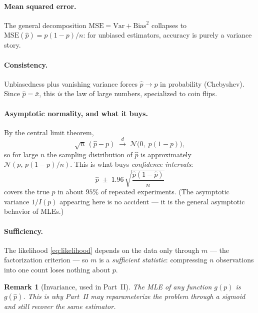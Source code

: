 \documentclass[11pt]{article}
\newtheorem{remark}{Remark}
\newcommand{\xbar}{\bar{x}}
\newcommand{\phat}{\hat{p}}
\begin{document}
\paragraph{Mean squared error.} The general decomposition
$\mathrm{MSE} = \mathrm{Var} + \mathrm{Bias}^{2}$ collapses to
$\mathrm{MSE}(\phat) = p(1-p)/n$: for unbiased estimators, accuracy is
purely a variance story.

\paragraph{Consistency.} Unbiasedness plus vanishing variance forces
$\phat \to p$ in probability (Chebyshev). Since $\phat = \xbar$, this
\emph{is} the law of large numbers, specialized to coin flips.

\paragraph{Asymptotic normality, and what it buys.}
By the central limit theorem,
\begin{equation}
  \sqrt{n}\,(\phat - p) \;\xrightarrow{\;d\;}\;
  \mathcal{N}\bigl(0,\; p(1-p)\bigr),
  \label{eq:clt}
\end{equation}
so for large $n$ the sampling distribution of $\phat$ is approximately
$\mathcal{N}(p,\, p(1-p)/n)$. This is what buys \emph{confidence
intervals}:
\begin{equation}
  \phat \;\pm\; 1.96\,\sqrt{\frac{\phat(1-\phat)}{n}}
  \label{eq:ci}
\end{equation}
covers the true $p$ in about $95\%$ of repeated experiments. (The
asymptotic variance $1/I(p)$ appearing here is no accident --- it is the
general asymptotic behavior of MLEs.)

\paragraph{Sufficiency.} The likelihood \eqref{eq:likelihood} depends on
the data only through $m$ --- the factorization criterion --- so $m$ is a
\emph{sufficient statistic}: compressing $n$ observations into one count
loses nothing about $p$.

\begin{remark}[Invariance, used in Part~II]
The MLE of any function $g(p)$ is $g(\phat)$. This is why Part~II may
reparameterize the problem through a sigmoid and still recover the same
estimator.
\end{remark}
\end{document}
